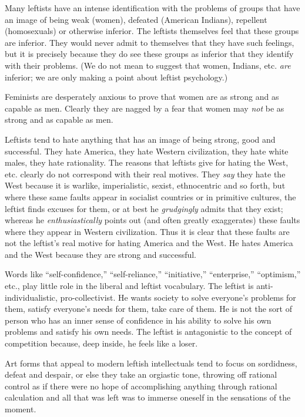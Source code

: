  Many leftists have an intense identification with the problems of groups that have an image of being weak (women), defeated (American Indians), repellent (homosexuals) or otherwise inferior. The leftists themselves feel that these groups are inferior. They would never admit to themselves that they have such feelings, but it is precisely because they do see these groups as inferior that they identify with their problems. (We do not mean to suggest that women, Indians, etc. {\em are} inferior; we are only making a point about leftist psychology.)

{
 Feminists are desperately anxious to prove that women are as strong and as capable as men. Clearly they are nagged by a fear that women may {\em not} be as strong and as capable as men.}

 Leftists tend to hate anything that has an image of being strong, good and successful. They hate America, they hate Western civilization, they hate white males, they hate rationality. The reasons that leftists give for hating the West, etc. clearly do not correspond with their real motives. They {\em say} they hate the West because it is warlike, imperialistic, sexist, ethnocentric and so forth, but where these same faults appear in socialist countries or in primitive cultures, the leftist finds excuses for them, or at best he {\em grudgingly} admits that they exist; whereas he {\em enthusiastically} points out (and often greatly exaggerates) these faults where they appear in Western civilization. Thus it is clear that these faults are not the leftist’s real motive for hating America and the West. He hates America and the West because they are strong and successful.

 Words like “self-confidence,” “self-reliance,” “initiative,” “enterprise,” “optimism,” etc., play little role in the liberal and leftist vocabulary. The leftist is anti-individualistic, pro-collectivist. He wants society to solve everyone’s problems for them, satisfy everyone’s needs for them, take care of them. He is not the sort of person who has an inner sense of confidence in his ability to solve his own problems and satisfy his own needs. The leftist is antagonistic to the concept of competition because, deep inside, he feels like a loser.

 Art forms that appeal to modern leftish intellectuals tend to focus on sordidness, defeat and despair, or else they take an orgiastic tone, throwing off rational control as if there were no hope of accomplishing anything through rational calculation and all that was left was to immerse oneself in the sensations of the moment.

